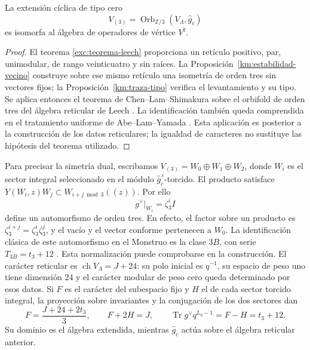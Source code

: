 \begin{theorem}
\label{km:moonshine-tres}
La extensión cíclica de tipo cero
\begin{equation}
 V_{(3)}=\operatorname{Orb}_{\mathbb Z/3}
                 (V_\Lambda,\widehat g_c)
 \label{km:extension-orden3}
\end{equation}
es isomorfa al álgebra de operadores de vértice \(V^\natural\).
\end{theorem}
\begin{proof}
El teorema \ref{exc:teorema-leech} proporciona un retículo positivo,
par, unimodular, de rango veinticuatro y sin raíces. La
Proposición~\ref{km:estabilidad-vecino} construye sobre ese mismo
retículo una isometría de orden tres sin vectores fijos; la
Proposición~\ref{km:traza-tipo} verifica el levantamiento y su tipo.
Se aplica entonces el teorema de Chen--Lam--Shimakura sobre el
orbifold de orden tres del álgebra reticular de Leech
\cite[Teorema~1.1]{chenlamshimakura2016}. La identificación también queda comprendida
en el tratamiento uniforme de Abe--Lam--Yamada
\cite[Teorema~4.4 y secciones~2--4]{abelamyamada2017}. Esta aplicación es posterior a la construcción
de los datos reticulares; la igualdad de caracteres no sustituye las
hipótesis del teorema utilizado.
\end{proof}

Para precisar la simetría dual, escribamos
\(V_{(3)}=W_0\oplus W_1\oplus W_2\), donde \(W_i\) es el sector
integral seleccionado en el módulo \(\widehat g_c^{\,i}\)-torcido.
El producto satisface
\(Y(W_i,z)W_j\subset W_{i+j\bmod3}((z))\). Por ello
\begin{equation}
 g^\vee|_{W_i}=\zeta_3^i I
 \label{km:dual-ciclico}
\end{equation}
define un automorfismo de orden tres. En efecto, el factor sobre un
producto es \(\zeta_3^{i+j}=\zeta_3^i\zeta_3^j\), y el vacío y el
vector conforme pertenecen a \(W_0\). La identificación clásica de
este automorfismo en el Monstruo es la clase \(3B\), con serie
\(T_{3B}=t_3+12\) \cite{kmconwaynorton1979,borcherds}.
Esta normalización puede comprobarse en la construcción. El carácter
reticular es \(\operatorname{ch}V_\Lambda=J+24\): su polo inicial
es \(q^{-1}\), su espacio de peso uno tiene dimensión 24 y el
carácter modular de peso cero queda determinado por esos datos.
Si \(F\) es el carácter del subespacio fijo y \(H\) el de cada
sector torcido integral, la proyección sobre invariantes y la conjugación
de los dos sectores dan
\[
 F=\frac{J+24+2t_3}{3},\qquad F+2H=J,
 \qquad \operatorname{Tr}g^\vee q^{L_0-1}=F-H=t_3+12.
\]
Su dominio es el álgebra extendida, mientras
\(\widehat g_c\) actúa sobre el álgebra reticular anterior.

